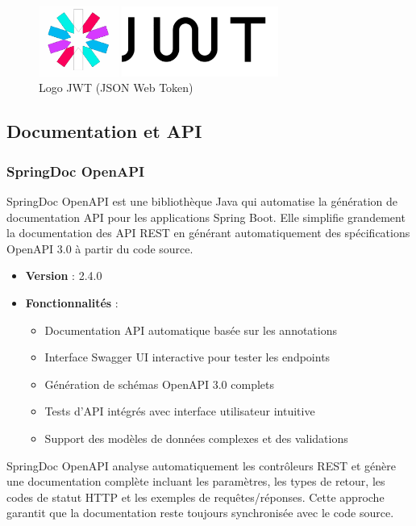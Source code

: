 \documentclass[12pt,a4paper]{report}
\begin{document}
\begin{figure}[H]
\centering
\includegraphics[width=0.7\textwidth]{latex_media/media/image25.png}
\caption{Logo JWT (JSON Web Token)}
\label{fig:logo-jwt}
\end{figure}

\subsection{Documentation et API}

\subsubsection{SpringDoc OpenAPI}

SpringDoc OpenAPI est une bibliothèque Java qui automatise la génération de documentation API pour les applications Spring Boot. Elle simplifie grandement la documentation des API REST en générant automatiquement des spécifications OpenAPI 3.0 à partir du code source.

\begin{itemize}
\item \textbf{Version} : 2.4.0
\item \textbf{Fonctionnalités} :
  \begin{itemize}
  \item Documentation API automatique basée sur les annotations
  \item Interface Swagger UI interactive pour tester les endpoints
  \item Génération de schémas OpenAPI 3.0 complets
  \item Tests d'API intégrés avec interface utilisateur intuitive
  \item Support des modèles de données complexes et des validations
  \end{itemize}
\end{itemize}

SpringDoc OpenAPI analyse automatiquement les contrôleurs REST et génère une documentation complète incluant les paramètres, les types de retour, les codes de statut HTTP et les exemples de requêtes/réponses. Cette approche garantit que la documentation reste toujours synchronisée avec le code source.
\end{document}
